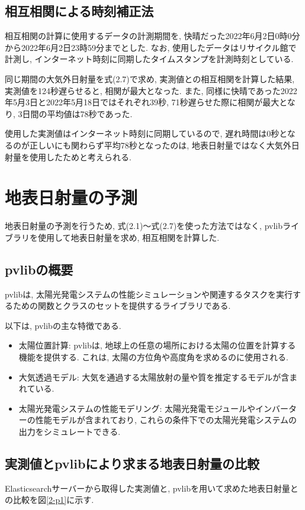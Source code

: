 
\subsection{相互相関による時刻補正法}
相互相関の計算に使用するデータの計測期間を, 快晴だった2022年6月2日0時0分から2022年6月2日23時59分までとした. なお, 使用したデータはリサイクル館で計測し, インターネット時刻に同期したタイムスタンプを計測時刻としている.

同じ期間の大気外日射量を式(2.7)で求め, 実測値との相互相関を計算した結果, 実測値を124秒遅らせると, 相関が最大となった. また, 同様に快晴であった2022年5月3日と2022年5月18日ではそれぞれ39秒, 71秒遅らせた際に相関が最大となり, 3日間の平均値は78秒であった.

使用した実測値はインターネット時刻に同期しているので, 遅れ時間は0秒となるのが正しいにも関わらず平均78秒となったのは, 地表日射量ではなく大気外日射量を使用したためと考えられる.

\section{地表日射量の予測}

地表日射量の予測を行うため, 式(2.1)～式(2.7)を使った方法ではなく, pvlibライブラリ\cite {2}を使用して地表日射量を求め, 相互相関を計算した.

\subsection{pvlibの概要}
pvlibは, 太陽光発電システムの性能シミュレーションや関連するタスクを実行するための関数とクラスのセットを提供するライブラリである. 

以下は, pvlibの主な特徴である.

\begin{itemize}
  \item 太陽位置計算: pvlibは, 地球上の任意の場所における太陽の位置を計算する機能を提供する. これは, 太陽の方位角や高度角を求めるのに使用される.
  \item 大気透過モデル: 大気を通過する太陽放射の量や質を推定するモデルが含まれている.
  \item 太陽光発電システムの性能モデリング: 太陽光発電モジュールやインバーターの性能モデルが含まれており, これらの条件下での太陽光発電システムの出力をシミュレートできる.
\end{itemize}

\subsection{実測値とpvlibにより求まる地表日射量の比較}
Elasticsearchサーバーから取得した実測値と, pvlibを用いて求めた地表日射量との比較を図\ref{2-p1}に示す.

